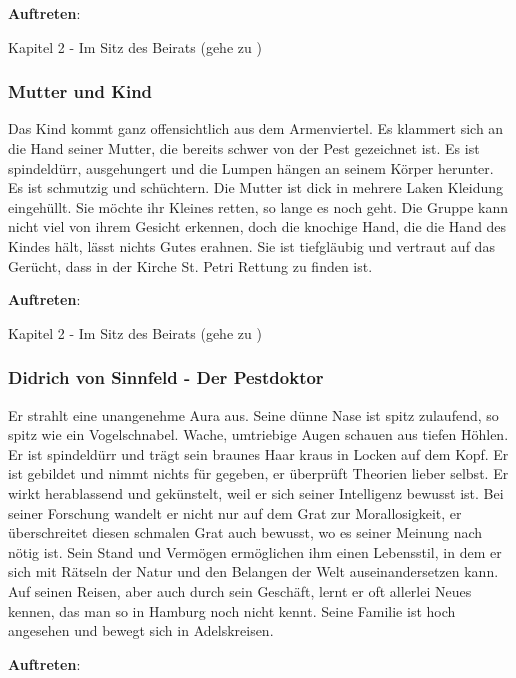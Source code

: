 \textbf{Auftreten}:

Kapitel 2 - Im Sitz des Beirats (gehe zu \blue{\ref{militär}})

\subsubsection*{Mutter und Kind}
\label{MutterKind}

Das Kind kommt ganz offensichtlich aus dem Armenviertel. Es klammert sich an die Hand seiner Mutter, die bereits schwer von der Pest gezeichnet ist. Es ist spindeldürr, ausgehungert und die Lumpen hängen an seinem Körper herunter. Es ist schmutzig und schüchtern. Die Mutter ist dick in mehrere Laken Kleidung eingehüllt. Sie möchte ihr Kleines retten, so lange es noch geht. Die Gruppe kann nicht viel von ihrem Gesicht erkennen, doch die knochige Hand, die die Hand des Kindes hält, lässt nichts Gutes erahnen. Sie ist tiefgläubig und vertraut auf das Gerücht, dass in der Kirche St. Petri Rettung zu finden ist.

\textbf{Auftreten}:

Kapitel 2 - Im Sitz des Beirats (gehe zu \blue{\ref{kind}})

\subsubsection*{Didrich von Sinnfeld - Der Pestdoktor}
\label{Didrich}

Er strahlt eine unangenehme Aura aus. Seine dünne Nase ist spitz zulaufend, so spitz wie ein Vogelschnabel. Wache, umtriebige Augen schauen aus tiefen Höhlen. Er ist spindeldürr und trägt sein braunes Haar kraus in Locken auf dem Kopf. Er ist gebildet und nimmt nichts für gegeben, er überprüft Theorien lieber selbst. Er wirkt herablassend und gekünstelt, weil er sich seiner Intelligenz bewusst ist. Bei seiner Forschung wandelt er nicht nur auf dem Grat zur Morallosigkeit, er überschreitet diesen schmalen Grat auch bewusst, wo es seiner Meinung nach nötig ist. Sein Stand und Vermögen ermöglichen ihm einen Lebensstil, in dem er sich mit Rätseln der Natur und den Belangen der Welt auseinandersetzen kann. Auf seinen Reisen, aber auch durch sein Geschäft, lernt er oft allerlei Neues kennen, das man so in Hamburg noch nicht kennt. Seine Familie ist hoch angesehen und bewegt sich in Adelskreisen.


\textbf{Auftreten}:

